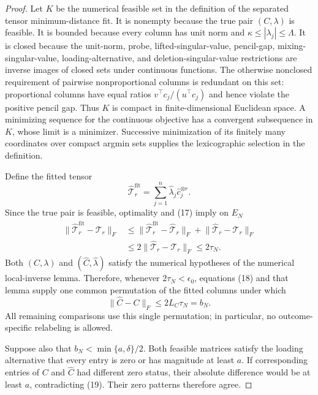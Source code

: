 \documentclass{article}
\begin{document}
\begin{proof}
Let \(K\) be the numerical feasible set in the definition of the separated tensor minimum-distance fit. It is nonempty because the true pair \((C,\lambda)\) is feasible. It is bounded because every column has unit norm and \(\kappa\le|\lambda_j|\le\Lambda\). It is closed because the unit-norm, probe, lifted-singular-value, pencil-gap, mixing-singular-value, loading-alternative, and deletion-singular-value restrictions are inverse images of closed sets under continuous functions. The otherwise nonclosed requirement of pairwise nonproportional columns is redundant on this set: proportional columns have equal ratios \(v^\top c_j/(u^\top c_j)\) and hence violate the positive pencil gap. Thus \(K\) is compact in finite-dimensional Euclidean space. A minimizing sequence for the continuous objective has a convergent subsequence in \(K\), whose limit is a minimizer. Successive minimization of its finitely many coordinates over compact argmin sets supplies the lexicographic selection in the definition.

Define the fitted tensor
\[
 \widehat{\mathcal T}^{\mathrm{fit}}_r
 =\sum_{j=1}^n\widehat\lambda_j\widehat c_j^{\otimes r}.
\]
Since the true pair is feasible, optimality and (17) imply on \(E_N\)
\[
 \begin{aligned}
 \lVert\widehat{\mathcal T}^{\mathrm{fit}}_r-\mathcal T_r\rVert_F
 &\le
 \lVert\widehat{\mathcal T}^{\mathrm{fit}}_r-
 \widehat{\mathcal T}_r\rVert_F
 +\lVert\widehat{\mathcal T}_r-\mathcal T_r\rVert_F\\
 &\le2\lVert\widehat{\mathcal T}_r-\mathcal T_r\rVert_F
 \le2\tau_N.
 \end{aligned}
 \tag{18}
\]
Both \((C,\lambda)\) and \((\widehat C,\widehat\lambda)\) satisfy the numerical hypotheses of the numerical local-inverse lemma. Therefore, whenever \(2\tau_N<\epsilon_0\), equations (18) and that lemma supply one common permutation of the fitted columns under which
\[
 \lVert\widehat C-C\rVert_F
 \le2L_C\tau_N=b_N.
 \tag{19}
\]
All remaining comparisons use this single permutation; in particular, no outcome-specific relabeling is allowed.

Suppose also that \(b_N<\min\{a,\delta\}/2\). Both feasible matrices satisfy the loading alternative that every entry is zero or has magnitude at least \(a\). If corresponding entries of \(C\) and \(\widehat C\) had different zero status, their absolute difference would be at least \(a\), contradicting (19). Their zero patterns therefore agree.


\end{proof}
\end{document}
